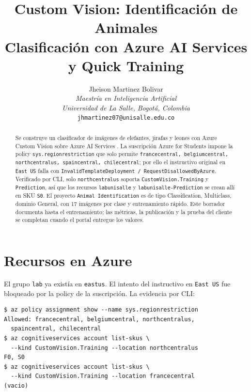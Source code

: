 \documentclass[10pt,journal]{IEEEtran}
\begin{document}
  \title{Custom Vision: Identificaci\'on de Animales\\ Clasificaci\'on con Azure AI Services y Quick Training}

  \author{
    Jheison Martinez Bolivar\\
    \textit{Maestr\'ia en Inteligencia Artificial}\\
    \textit{Universidad de La Salle, Bogot\'a, Colombia}\\
    \texttt{jhmartinez07@unisalle.edu.co}
  }
  \maketitle

  \begin{abstract}
    Se construye un clasificador de im\'agenes de elefantes, jirafas y leones con Azure Custom Vision \cite{microsoft_customvision2024} sobre Azure AI Services \cite{microsoft_cognitiveservices2024}. La suscripci\'on Azure for Students impone la policy \texttt{sys.regionrestriction} que solo permite \texttt{francecentral, belgiumcentral, northcentralus, spaincentral, chilecentral}; por ello el instructivo original en \texttt{East US} falla con \texttt{InvalidTemplateDeployment / RequestDisallowedByAzure}. Verificado por CLI, solo \texttt{northcentralus} soporta \texttt{CustomVision.Training} y \texttt{Prediction}, as\'i que los recursos \texttt{labunisalle} y \texttt{labunisalle-Prediction} se crean all\'i en SKU \texttt{S0}. El proyecto \texttt{Animal Identification} es de tipo Classification, Multiclass, dominio General, con 17 im\'agenes por clase y entrenamiento r\'apido. Este borrador documenta hasta el entrenamiento; las m\'etricas, la publicaci\'on y la prueba del cliente se completan cuando el portal entregue los valores.
  \end{abstract}

  \section{Recursos en Azure}

  El grupo \texttt{lab} ya exist\'ia en \texttt{eastus}. El intento del instructivo en \texttt{East US} fue bloqueado por la policy de la suscripci\'on. La evidencia por CLI:

  \begin{lstlisting}
$ az policy assignment show --name sys.regionrestriction
Allowed: francecentral, belgiumcentral, northcentralus,
  spaincentral, chilecentral
$ az cognitiveservices account list-skus \
  --kind CustomVision.Training --location northcentralus
F0, S0
$ az cognitiveservices account list-skus \
  --kind CustomVision.Training --location francecentral
(vacio)
  \end{lstlisting}
\end{document}
